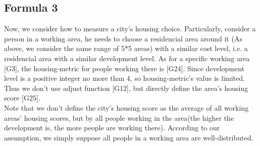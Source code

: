 \subsection{Formula 3}
Now, we consider how to measure a city's housing choice.
Particularly, consider a person in a working area, he needs to choose a residencial area around it (As above, we consider the same range of 5*5 areas) with a similar cost level, i.e. a residencial area with a similar development level.
As for a specific working area [G3], the housing-metric for people working there is [G24].
Since development level is a positive integer no more than 4, so housing-metric's value is limited.
Thus we don't use adjust function [G12], but directly define the area's housing score [G25].
\\
Note that we don't define the city's housing score as the average of all working areas' housing scores, but by all people working in the area(the higher the development is, the more people are working there).
According to our assumption, we simply suppose all people in a working area are well-distributed.
\\

